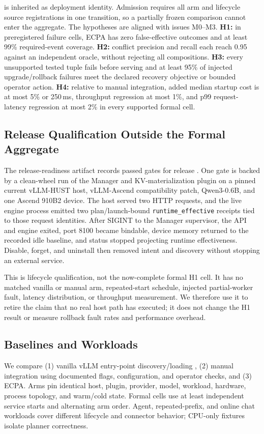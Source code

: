 \documentclass[letterpaper,twocolumn,10pt]{article}
\newcommand{\system}{\textsc{ECPA}\xspace}
\newcommand{\code}[1]{\texttt{#1}}
\begin{document}
is inherited as deployment identity.  Admission requires all arm and lifecycle
source registrations in one transition, so a partially frozen comparison
cannot enter the aggregate.
The hypotheses are aligned with issues M0--M3.  \textbf{H1:} in preregistered
failure cells, \system has zero
false-effective outcomes and at least 99\% required-event coverage.
\textbf{H2:} conflict precision and recall each reach 0.95 against an
independent oracle, without rejecting all compositions.  \textbf{H3:} every
unsupported tested tuple fails before serving and at least 95\% of injected
upgrade/rollback failures meet the declared recovery objective or bounded
operator action.  \textbf{H4:} relative to manual integration, added median
startup cost is at most 5\% or 250\,ms, throughput regression at most 1\%, and
p99 request-latency regression at most 2\% in every supported formal cell.

\subsection{Release Qualification Outside the Formal Aggregate}
The release-readiness artifact records \ECPAReleaseGates{} passed gates for
release \ECPAReleaseVersion{}.  One gate is backed by a clean-wheel run of the
Manager and KV-materialization plugin on a pinned current vLLM-HUST host,
vLLM-Ascend compatibility patch, Qwen3-0.6B, and one Ascend 910B2 device.  The
host served two HTTP requests, and the live engine process emitted two
plan/launch-bound \code{runtime\_effective} receipts tied to those request
identities.  After SIGINT to the Manager supervisor, the API and engine exited,
port 8100 became bindable, device memory returned to the recorded idle
baseline, and status stopped projecting runtime effectiveness.  Disable,
forget, and uninstall then removed intent and discovery without stopping an
external service.

This is \ECPANativeLifecycleQualifications{} lifecycle qualification, not the
now-complete formal H1 cell.  It has no matched vanilla
or manual arm, repeated-start schedule, injected partial-worker fault, latency
distribution, or throughput measurement.  We therefore use it to retire the
claim that no real host path has executed; it does not change the H1 result or
measure rollback fault rates and performance overhead.

\subsection{Baselines and Workloads}
We compare (1) vanilla vLLM entry-point discovery/loading
\cite{vllm-plugin,vllm-arch}, (2) manual integration using documented flags,
configuration, and operator checks, and (3) \system.  Arms pin identical host,
plugin, provider, model, workload, hardware, process topology, and warm/cold
state.  Formal cells use at least \ECPAMinimumStarts{} independent service starts and
alternating arm order.  Agent, repeated-prefix, and online chat workloads cover
different lifecycle and connector behavior; CPU-only fixtures isolate planner
correctness.
\end{document}
